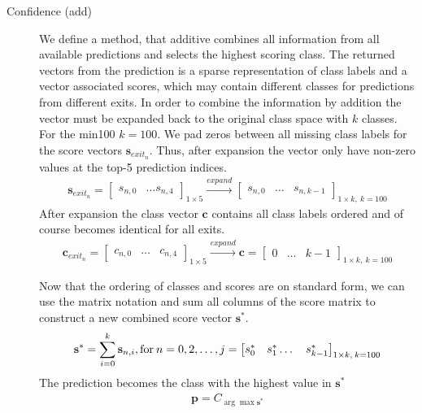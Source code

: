 \begin{description}
	\item[Confidence (add)] We define a method, that additive combines all information from all available predictions and selects the highest scoring class. The returned vectors from the prediction is a sparse representation of class labels and a vector associated scores, which may contain different classes for predictions from different exits. In order to combine the information by addition the vector must be expanded back to the original class space with $k$ classes. For the \gls{min100} $k=100$. We pad zeros between all missing class labels for the score vectors $\mathbf{s}_{exit_n}$. Thus, after expansion the vector only have non-zero values at the top-5 prediction indices.
	\begin{align*}
		\mathbf{s}_{exit_n} = 
		\begin{bmatrix}
			s_{n,0} & \dots s_{n,4}
		\end{bmatrix}_{1 \times 5} 
		\xrightarrow{expand} 
		\begin{bmatrix}
		s_{n,0} & \dots & s_{n,k-1}
		\end{bmatrix}_{1 \times k,\: k=100} 
	\end{align*}
	After expansion the class vector $\mathbf{c}$ contains all class labels ordered and of course becomes identical for all exits.
	\begin{align*}
		\mathbf{c}_{exit_n}= 
		\begin{bmatrix}
		c_{n,0} & \dots & c_{n,4}
		\end{bmatrix}_{1 \times 5}
				\xrightarrow{expand} 
		\mathbf{c} =
		\begin{bmatrix}
		0 & \dots & k-1
		\end{bmatrix}_{1 \times k,\: k=100} 
	\end{align*}
	
	 Now that the ordering of classes and scores are on standard form, we can use the matrix notation and sum all columns of the score matrix to construct a new combined score vector $\mathbf{s^*}$.
	\begin{align*}
		\mathbf{s^*} = \sum_{i=0}^{k} \mathbf{s}_{n,i}, \text{for\:} n=0, 2, \dots, j =		
		\begin{bmatrix}
		s^*_0 & s^*_1 \dots & s^*_{k-1}
		\end{bmatrix}_{1 \times k,\: k=100} 
	\end{align*}
	The prediction becomes the class with the highest value in $\mathbf{s^*}$
	\begin{align*}
		\mathbf{p} = C_{\arg \max \mathbf{s^*}}
	\end{align*}
		

\end{description}
